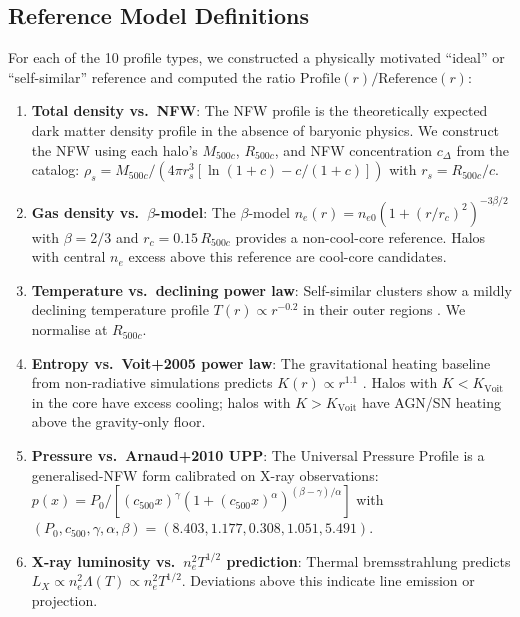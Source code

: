 \documentclass[12pt,a4paper]{article}
\begin{document}
\subsection{Reference Model Definitions}

For each of the 10 profile types, we constructed a physically motivated ``ideal'' or
``self-similar'' reference and computed the ratio $\mathrm{Profile}(r) / \mathrm{Reference}(r)$:

\begin{enumerate}
  \item \textbf{Total density vs.\ NFW}: The NFW profile \citep{navarro1997} is the
        theoretically expected dark matter density profile in the absence of baryonic
        physics. We construct the NFW using each halo's $M_{500c}$, $R_{500c}$, and
        NFW concentration $c_\Delta$ from the catalog:
        $\rho_s = M_{500c}/(4\pi r_s^3[\ln(1+c)-c/(1+c)])$ with $r_s = R_{500c}/c$.

  \item \textbf{Gas density vs.\ $\beta$-model}: The $\beta$-model
        $n_e(r) = n_{e0}(1+(r/r_c)^2)^{-3\beta/2}$ with $\beta=2/3$ and
        $r_c = 0.15\,R_{500c}$ provides a non-cool-core reference. Halos with
        central $n_e$ excess above this reference are cool-core candidates.

  \item \textbf{Temperature vs.\ declining power law}: Self-similar clusters
        show a mildly declining temperature profile $T(r) \propto r^{-0.2}$
        in their outer regions \citep{vikhlinin2006}. We normalise at $R_{500c}$.

  \item \textbf{Entropy vs.\ Voit+2005 power law}: The gravitational heating
        baseline from non-radiative simulations predicts $K(r) \propto r^{1.1}$
        \citep{voit2005}. Halos with $K < K_\mathrm{Voit}$ in the core have
        excess cooling; halos with $K > K_\mathrm{Voit}$ have AGN/SN heating
        above the gravity-only floor.

  \item \textbf{Pressure vs.\ Arnaud+2010 UPP}: The Universal Pressure Profile
        \citep{arnaud2010} is a generalised-NFW form calibrated on X-ray
        observations:
        $p(x) = P_0/[(c_{500}x)^\gamma(1+(c_{500}x)^\alpha)^{(\beta-\gamma)/\alpha}]$
        with $(P_0, c_{500}, \gamma, \alpha, \beta) = (8.403, 1.177, 0.308, 1.051, 5.491)$.

  \item \textbf{X-ray luminosity vs.\ $n_e^2 T^{1/2}$ prediction}: Thermal
        bremsstrahlung predicts $L_X \propto n_e^2 \Lambda(T) \propto n_e^2 T^{1/2}$.
        Deviations above this indicate line emission or projection.


\end{enumerate}
\end{document}
